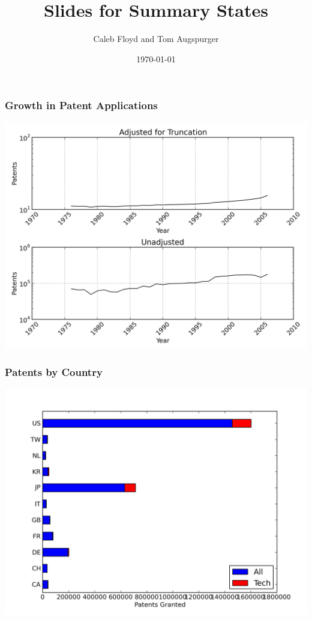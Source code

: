 \documentclass{beamer}
\title{Slides for Summary States}
\author{Caleb Floyd and Tom Augspurger}
\date{\today}
\begin{document}
\frame{\titlepage}

\section[Outline]{}
\frame{\tableofcontents}


\begin{frame}[t]\frametitle{Growth in Patent Applications} 

  \begin{center}
      \includegraphics[scale=.5]{grant_year.png}
      \label{fig:grant_year}
  \end{center}
\end{frame}

\begin{frame}[t]\frametitle{Patents by Country} 

\begin{center}
  \includegraphics[scale=.5]{by_country.png}
  \label{fig:by_country}
\end{center}
\end{frame}
\end{document}
